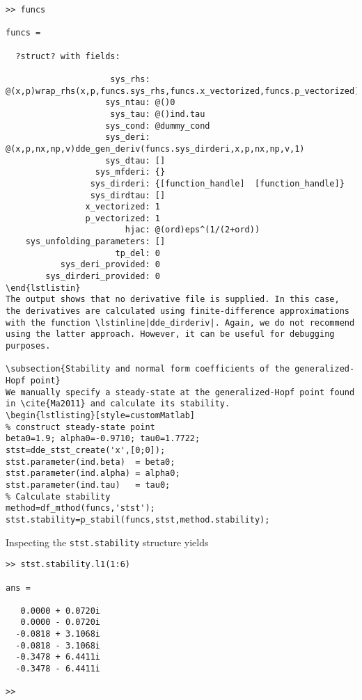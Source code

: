 \begin{lstlisting}[style=customBash,keepspaces=true] 
>> funcs

funcs = 

  ?struct? with fields:

                     sys_rhs: @(x,p)wrap_rhs(x,p,funcs.sys_rhs,funcs.x_vectorized,funcs.p_vectorized)
                    sys_ntau: @()0
                     sys_tau: @()ind.tau
                    sys_cond: @dummy_cond
                    sys_deri: @(x,p,nx,np,v)dde_gen_deriv(funcs.sys_dirderi,x,p,nx,np,v,1)
                    sys_dtau: []
                  sys_mfderi: {}
                 sys_dirderi: {[function_handle]  [function_handle]}
                 sys_dirdtau: []
                x_vectorized: 1
                p_vectorized: 1
                        hjac: @(ord)eps^(1/(2+ord))
    sys_unfolding_parameters: []
                      tp_del: 0
           sys_deri_provided: 0
        sys_dirderi_provided: 0
\end{lstlistin}
The output shows that no derivative file is supplied. In this case, the derivatives are calculated using finite-difference approximations with the function \lstinline|dde_dirderiv|. Again, we do not recommend using the latter approach. However, it can be useful for debugging purposes.

\subsection{Stability and normal form coefficients of the generalized-Hopf point}
We manually specify a steady-state at the generalized-Hopf point found in \cite{Ma2011} and calculate its stability.
\begin{lstlisting}[style=customMatlab]
% construct steady-state point
beta0=1.9; alpha0=-0.9710; tau0=1.7722;
stst=dde_stst_create('x',[0;0]);
stst.parameter(ind.beta)  = beta0;
stst.parameter(ind.alpha) = alpha0;
stst.parameter(ind.tau)   = tau0;
% Calculate stability
method=df_mthod(funcs,'stst');
stst.stability=p_stabil(funcs,stst,method.stability);
\end{lstlisting}
Inspecting the \lstinline|stst.stability| structure yields
\begin{lstlisting}[style=matlabConsole]
>> stst.stability.l1(1:6)

ans =

   0.0000 + 0.0720i
   0.0000 - 0.0720i
  -0.0818 + 3.1068i
  -0.0818 - 3.1068i
  -0.3478 + 6.4411i
  -0.3478 - 6.4411i

>> 
\end{lstlisting}
